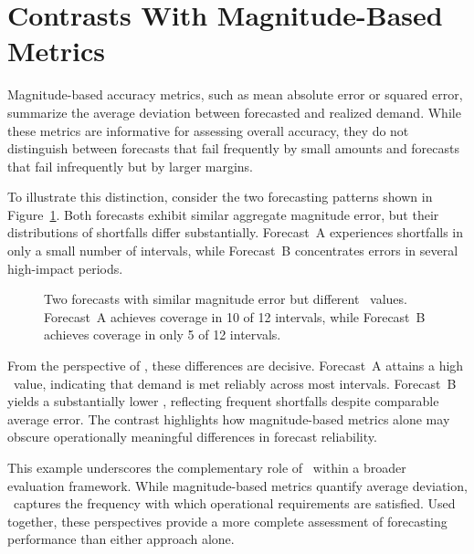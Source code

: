 \section{Contrasts With Magnitude-Based Metrics}

Magnitude-based accuracy metrics, such as mean absolute error or squared error,
summarize the average deviation between forecasted and realized demand. While
these metrics are informative for assessing overall accuracy, they do not
distinguish between forecasts that fail frequently by small amounts and forecasts
that fail infrequently but by larger margins.

To illustrate this distinction, consider the two forecasting patterns shown in
Figure~\ref{fig:nsl_forecast_contrast}. Both forecasts exhibit similar aggregate
magnitude error, but their distributions of shortfalls differ substantially.
Forecast~A experiences shortfalls in only a small number of intervals, while
Forecast~B concentrates errors in several high-impact periods.

\begin{figure}[h!]
\centering

\caption{Two forecasts with similar magnitude error but different \NSL\ values.
Forecast~A achieves coverage in 10 of 12 intervals, while Forecast~B achieves
coverage in only 5 of 12 intervals.}
\label{fig:nsl_forecast_contrast}
\end{figure}

From the perspective of \NSL, these differences are decisive. Forecast~A attains a
high \NSL\ value, indicating that demand is met reliably across most intervals.
Forecast~B yields a substantially lower \NSL, reflecting frequent shortfalls despite
comparable average error. The contrast highlights how magnitude-based metrics alone
may obscure operationally meaningful differences in forecast reliability.

This example underscores the complementary role of \NSL\ within a broader
evaluation framework. While magnitude-based metrics quantify average deviation,
\NSL\ captures the frequency with which operational requirements are satisfied.
Used together, these perspectives provide a more complete assessment of forecasting
performance than either approach alone.
